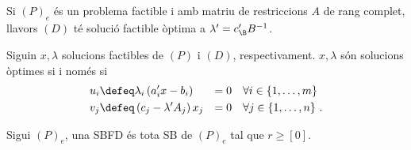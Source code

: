 \begin{col}
    Si $\left(P\right)_e$ és un problema factible i amb matriu de restriccions $A$ de rang complet, llavors $\left(D\right)$ té solució factible òptima a $\lambda' = c_\B'B^{-1}$.
\end{col}

\begin{teo}
    Siguin $x, \lambda$ solucions factibles de $\left(P\right)$ i $\left(D\right)$, respectivament. $x, \lambda$ són solucions òptimes si i només si
    \begin{alignat*}{2}{}
        u_i &\defeq \lambda_i \left(a_i'x - b_i\right) &= 0 &\quad \forall i \in \left\{1, \dots, m\right\} \\
        v_j &\defeq \left(c_j - \lambda'A_j\right) x_j &= 0 &\quad \forall j \in \left\{1, \dots, n\right\}\,.
    \end{alignat*}
\end{teo}

\begin{defi}
    Sigui $\left(P\right)_e$, una SBFD és tota SB de $\left(P\right)_e$ tal que $r \geq \left[0\right]$.
\end{defi}

